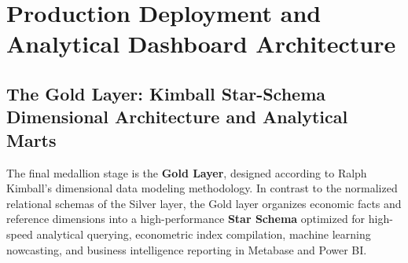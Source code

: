 \section{Production Deployment and Analytical Dashboard Architecture}

\subsection{The Gold Layer: Kimball Star-Schema Dimensional Architecture and Analytical Marts}
\hs The final medallion stage is the \textbf{Gold Layer}, designed according to Ralph Kimball's dimensional data modeling methodology. In contrast to the normalized relational schemas of the Silver layer, the Gold layer organizes economic facts and reference dimensions into a high-performance \textbf{Star Schema} optimized for high-speed analytical querying, econometric index compilation, machine learning nowcasting, and business intelligence reporting in Metabase and Power BI.

